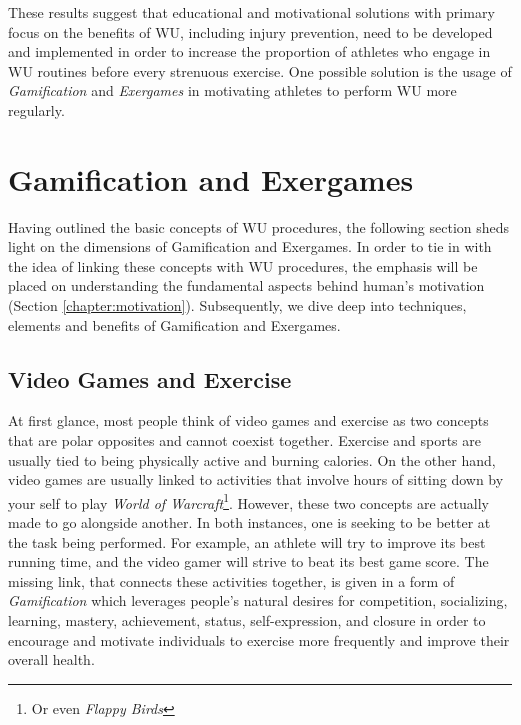These results suggest that educational and motivational solutions with primary focus on the benefits of WU, including injury prevention, need to be developed and implemented in order to increase the proportion of athletes who engage in WU routines before every strenuous exercise. One possible solution is the usage of \textit{Gamification} and \textit{Exergames} in motivating athletes to perform WU more regularly. 
\pagebreak
\section{Gamification and Exergames}
Having outlined the basic concepts of WU procedures, the following section sheds light on the dimensions of Gamification and Exergames. In order to tie in with the idea of linking these concepts with WU procedures, the emphasis will be placed on understanding the fundamental aspects behind human's motivation (Section   \ref{chapter:motivation}). Subsequently, we dive deep into techniques, elements and benefits of Gamification and Exergames.
\subsection{Video Games and Exercise}
At first glance, most people think of video games and exercise as two concepts that are polar opposites and cannot coexist together. Exercise and sports are usually tied to being physically active and burning calories. On the other hand, video games are usually linked to activities that involve hours of sitting down by your self to play \textit{World of Warcraft}\footnote{Or even \textit{Flappy Birds}}. However, these two concepts are actually made to go alongside another. In both instances, one is seeking to be better at the task being performed. For example, an athlete will try to improve its best running time, and the video gamer will strive to beat its best game score. The missing link, that connects these activities together, is given in a form of \textit{Gamification} which leverages people's natural desires for competition, socializing, learning, mastery, achievement, status, self-expression, and closure in order to encourage and motivate individuals to exercise more frequently and improve their overall health.
